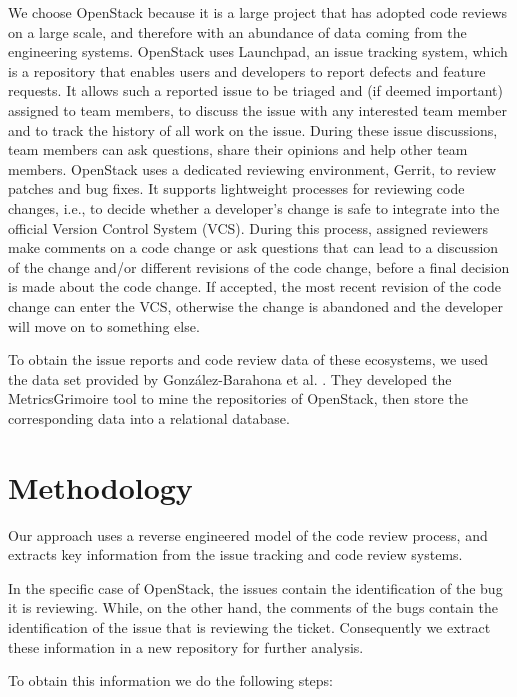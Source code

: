 \documentclass{sig-alternate-05-2015}
\begin{document}
We choose OpenStack because it is a large project that has adopted code
reviews on a large scale, and therefore with an abundance of data coming from the engineering systems.
OpenStack uses Launchpad, an issue tracking system, which is a repository that enables
users and developers to report defects and feature requests. It allows such a reported issue to be triaged and (if deemed
important) assigned to team members, to discuss the issue
with any interested team member and to track the history of
all work on the issue. During these issue discussions, team
members can ask questions, share their opinions and help
other team members. OpenStack uses a dedicated reviewing environment, 
Gerrit, to review patches and bug fixes. It supports 
lightweight processes for reviewing code changes, i.e., 
to decide whether a developer's change is safe to
integrate into the official Version Control System (VCS). During this process, 
assigned reviewers make comments
on a code change or ask questions that can lead to a discussion
of the change and/or different revisions of the code change,
before a final decision is made about the code change. If
accepted, the most recent revision of the code change can enter
the VCS, otherwise the change is abandoned
and the developer will move on to something else.

To obtain the issue reports and code review data of these ecosystems, we used the data set 
provided by Gonz\'alez-Barahona et al. \cite{con22}. They developed the MetricsGrimoire tool to mine the repositories of
OpenStack, then store the corresponding data into a relational database. 


\section{Methodology}
Our approach uses a reverse engineered model of the code review process, and extracts 
key information from the issue tracking and code review systems.

In the specific case of OpenStack, the issues contain the identification of the bug it is reviewing. While, on the other 
hand, the comments of the bugs contain the identification of the issue that is reviewing the ticket. Consequently we 
extract these information in a new repository for further analysis.

To obtain this information we do the following steps:
\end{document}
